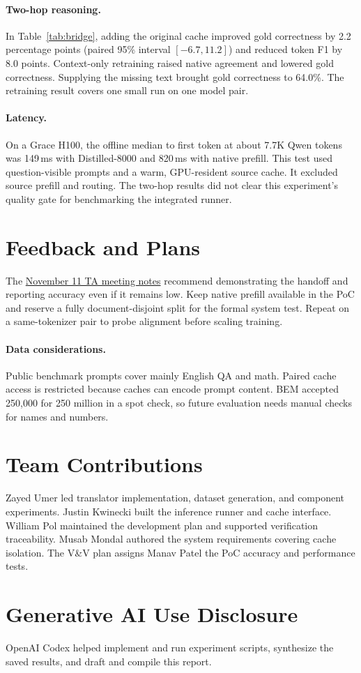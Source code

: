 \documentclass[11pt]{article}
\begin{document}
\paragraph{Two-hop reasoning.}
In Table~\ref{tab:bridge}, adding the original cache improved gold
correctness by 2.2 percentage points (paired 95\% interval
$[-6.7, 11.2]$) and reduced token F1 by 8.0 points. Context-only
retraining raised native agreement and lowered gold correctness.
Supplying the missing text brought gold correctness to 64.0\%.
The retraining result covers one small run on one model pair.

\paragraph{Latency.}
On a Grace H100, the offline median to first token at about 7.7K
Qwen tokens was 149\,ms with Distilled-8000 and 820\,ms with native
prefill. This test used question-visible prompts and a warm,
GPU-resident source cache. It excluded source prefill and routing.
The two-hop results did not clear this experiment's quality gate
for benchmarking the integrated runner.

\section{Feedback and Plans}

The \href{https://github.com/tandemkv/Tandem/issues/81}{November 11 TA meeting notes}
recommend demonstrating the handoff and reporting accuracy even if it
remains low. Keep native prefill available in the PoC and reserve a
fully document-disjoint split for the formal system test. Repeat on
a same-tokenizer pair to probe alignment before scaling training.

\paragraph{Data considerations.}
Public benchmark prompts cover mainly English QA and math. Paired
cache access is restricted because caches can encode prompt content.
BEM accepted 250,000 for 250 million in a spot check, so future
evaluation needs manual checks for names and numbers.

\section*{Team Contributions}

Zayed Umer led translator implementation, dataset generation, and
component experiments. Justin Kwinecki built the inference runner
and cache interface. William Pol maintained the development plan and
supported verification traceability. Musab Mondal authored the system
requirements covering cache isolation. The V\&V plan assigns Manav
Patel the PoC accuracy and performance tests.

\section*{Generative AI Use Disclosure}

OpenAI Codex helped implement and run experiment scripts, synthesize
the saved results, and draft and compile this report.


\end{document}
